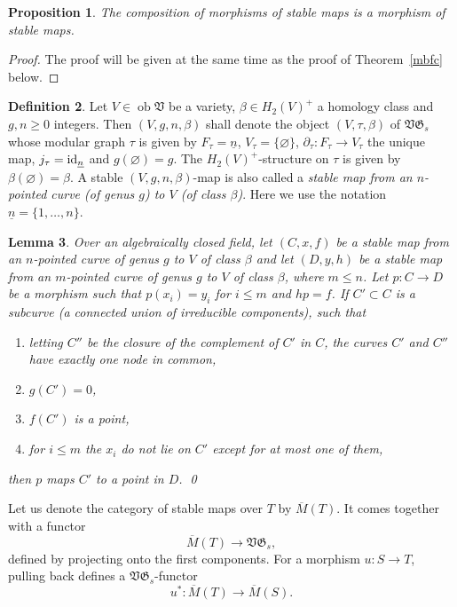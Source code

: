 \documentclass[11pt]{amsart}
\newtheorem{prop}{Proposition}[section]
\newtheorem{lem}[prop]{Lemma}
\theoremstyle{definition}
\newtheorem{defn}[prop]{Definition}
\theoremstyle{remark}
\newenvironment{pf}{\begin{proof}}{\end{proof}}
\newcommand{\upst}{^{\ast}}
\newcommand{\GG}{{\mathfrak{G}}}
\newcommand{\VV}{{\mathfrak{V}}}
\newcommand{\del}{\partial}
\newcommand{\ob}{\operatorname{ob}}
\newcommand{\id}{\operatorname{\rm id}}
\newcommand{\ol}{\overline}
\renewcommand{\ul}{\underline}
\renewcommand{\t}{_{\tau}}
\theoremstyle{plain}
\theoremstyle{definition}
\theoremstyle{remark}
\begin{document}
\begin{prop} \label{cmsmm}
The composition of morphisms of stable maps is a morphism of stable maps.
\end{prop}
\begin{pf}
The proof will be given at the same time as the proof of Theorem~\ref{mbfc}
below.
\end{pf}

\begin{defn} \label{sovgs}
Let \(V\in\ob\VV\) be a variety, \(\beta\in H_2(V)^+\) a homology class and
\(g,n\geq0\) integers. Then \((V,g,n,\beta)\) shall
denote the object \((V,\tau,\beta)\) of \(\VV\GG_s\) whose modular graph \(\tau\) is
given by \(F\t=\ul{n}\),
\(V\t=\{\varnothing\}\), \(\del\t:F\t\rightarrow V\t\) the unique map,
\(j\t=\id_{\ul{n}}\) and \(g(\varnothing)=g\). The
\(H_2(V)^+\)-structure on \(\tau\) is given by \(\beta(\varnothing)=\beta\). A stable
\((V,g,n,\beta)\)-map is also called a
{\em stable map from an \(n\)-pointed curve (of genus \(g\)) to \(V\) (of class
\(\beta\))}. Here we use the notation
\(\ul{n}=\{1,\ldots,n\}\).
\end{defn}

\begin{lem} \label{lcsn}
Over an algebraically closed field, let \((C,x,f)\) be a stable map from an
\(n\)-pointed curve of genus \(g\) to \(V\) of class
\(\beta\) and let \((D,y,h)\) be a stable map from an \(m\)-pointed curve of genus
\(g\) to \(V\) of class \(\beta\), where \(m\leq
n\). Let \(p:C\rightarrow D\) be a morphism such that \(p(x_i)=y_i\) for \(i\leq m\)
and \(hp=f\). If \(C'\subset C\) is a
subcurve (a connected union of irreducible components), such that
\begin{enumerate}
\item letting \(C''\) be the closure of the complement of \(C'\) in \(C\), the curves
\(C'\) and \(C''\) have exactly one node in
common,
\item \(g(C')=0\),
\item \(f(C')\) is a point,
\item for \(i\leq m\) the \(x_i\) do not lie on \(C'\) except for at most one of
them,
\end{enumerate}
then \(p\) maps \(C'\) to a point in \(D\). \qed
\end{lem}

Let us denote the category of stable maps over \(T\) by \(\ol{M}(T)\). It comes
together with a functor
\[
\ol{M}(T)\longrightarrow\VV\GG_s,
\]
defined by projecting onto the first components. For a morphism \(u:S\rightarrow
T\), pulling back defines a
\(\VV\GG_s\)-functor
\[
u\upst:\ol{M}(T)\longrightarrow \ol{M}(S).
\]
\end{document}
